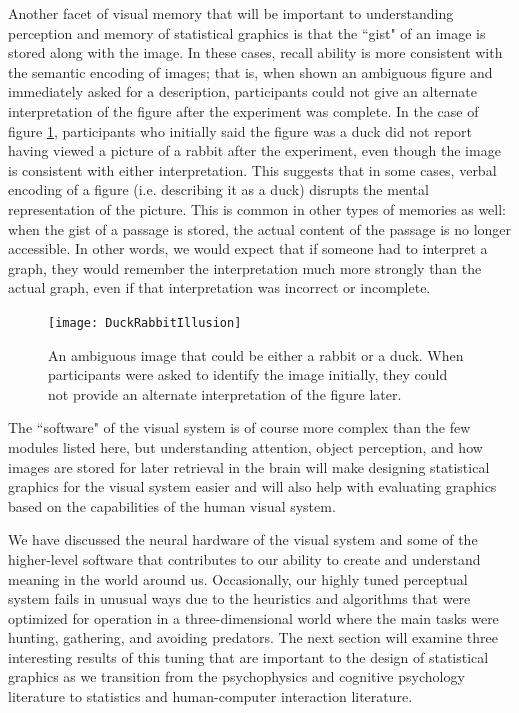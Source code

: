 \documentclass[11pt]{isuthesis}\usepackage[]{graphicx}\usepackage[]{color}
\begin{document}
Another facet of visual memory that will be important to understanding perception and memory of statistical graphics is that the ``gist" of an image is stored along with the image. In these cases, recall ability is more consistent with the semantic encoding of images; that is, when shown an ambiguous figure and immediately asked for a description, participants could not give an alternate interpretation of the figure after the experiment was complete. In the case of  figure \ref{fig:ambiguousrabbit}, participants who initially said the figure was a duck did not report having viewed a picture of a rabbit after the experiment, even though the image is consistent with either interpretation. This suggests that in some cases, verbal encoding of a figure (i.e. describing it as a duck) disrupts the mental representation of the picture. This is common in other types of memories as well: when the gist of a passage is stored, the actual content of the passage is no longer accessible. In other words, we would expect that if someone had to interpret a graph, they would remember the interpretation much more strongly than the actual graph, even if that interpretation was incorrect or incomplete. 

\begin{figure}[htbp]\centering
\texttt{[image: DuckRabbitIllusion]}
\caption[Ambiguous images]{An ambiguous image that could be either a rabbit or a duck. When participants were asked to identify the image initially, they could not provide an alternate interpretation of the figure later.}\label{fig:ambiguousrabbit}
\end{figure}

The ``software" of the visual system is of course more complex than the few modules listed here, but understanding attention, object perception, and how images are stored for later retrieval in the brain will make designing statistical graphics for the visual system easier and will also help with evaluating graphics based on the capabilities of the human visual system. 

We have discussed the neural hardware of the visual system and some of the higher-level software that contributes to our ability to create and understand meaning in the world around us. Occasionally, our highly tuned perceptual system fails in unusual ways due to the heuristics and algorithms that were optimized for operation in a three-dimensional world where the main tasks were hunting, gathering, and avoiding predators. The next section will examine three interesting results of this tuning that are important to the design of statistical graphics as we transition from the psychophysics and cognitive psychology literature to statistics and human-computer interaction literature. 
\end{document}
